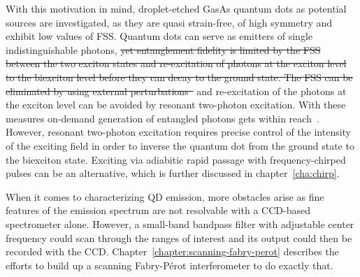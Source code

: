 With this motivation in mind, droplet-etched GasAs quantum dots as potential sources are investigated, as they are quasi strain-free, of high symmetry and exhibit low values of \ac{FSS}.
Quantum dots can serve as emitters of single indistinguishable photons, \sout{yet entanglement fidelity is limited by the \acs{FSS} between the two exciton states \cite{bayer_fine_2002} and re-excitation of photons at the exciton level to the biexciton level before they can decay to the ground state.
The \ac{FSS} can be eliminated by using external perturbations~\cite{plumhof_experimental_2012}} and re-excitation of the photons at the exciton level can be avoided by resonant two-photon excitation.
With these measures on-demand generation of entangled photons gets within reach~\cite{jayakumar_deterministic_2013}.
However, resonant two-photon excitation requires precise control of the intensity of the exciting field in order to inverse the quantum dot from the ground state to the biexciton state.
Exciting via adiabitic rapid passage with frequency-chirped pulses can be an alternative, which is further discussed in chapter~\ref{cha:chirp}.

When it comes to characterizing \ac{QD} emission, more obstacles arise as fine features of the emission spectrum are not resolvable with a CCD-based spectrometer alone.
However, a small-band bandpass filter with adjustable center frequency could scan through the ranges of interest and its output could then be recorded with the CCD.
Chapter~\ref{chapter:scanning-fabry-perot} describes the efforts to build up a scanning Fabry-Pérot interferometer to do exactly that. 


